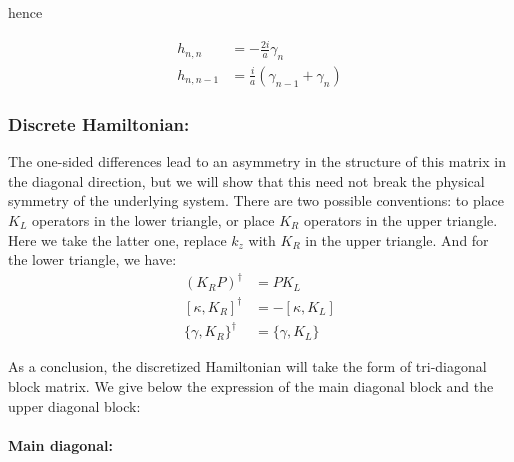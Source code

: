 \documentclass[prb,aps]{revtex4}
\begin{document}
		hence

		\begin{align}
			h_{n,n} &= -\frac{2i}{a} γ_{n}\\
			h_{n,n-1} &= \frac{i}{a} (γ_{n-1}+γ_{n})
		\end{align}

	\subsubsection{Discrete Hamiltonian:}

    The one-sided differences lead to an asymmetry in the structure of this matrix in the diagonal direction, but we will show that this need not break the physical symmetry of the underlying system. There are two possible conventions: to place $K_L$ operators in the lower triangle, or place $K_R$ operators in the upper triangle. Here we take the latter one, replace $k_z$ with $K_R$ in the upper triangle. And for the lower triangle, we have:
	\begin{align}
		(K_RP)^\dagger &= PK_L\\
		[\kappa, K_R]^\dagger &= -[\kappa, K_L]\\
		\{\gamma, K_R\}^\dagger &= \{\gamma, K_L\}
	\end{align}	    
    
    As a conclusion, the discretized Hamiltonian will take the form of tri-diagonal block matrix. We give below the expression of the main diagonal block and the upper diagonal block:

    \paragraph{Main diagonal:\\}
\end{document}
